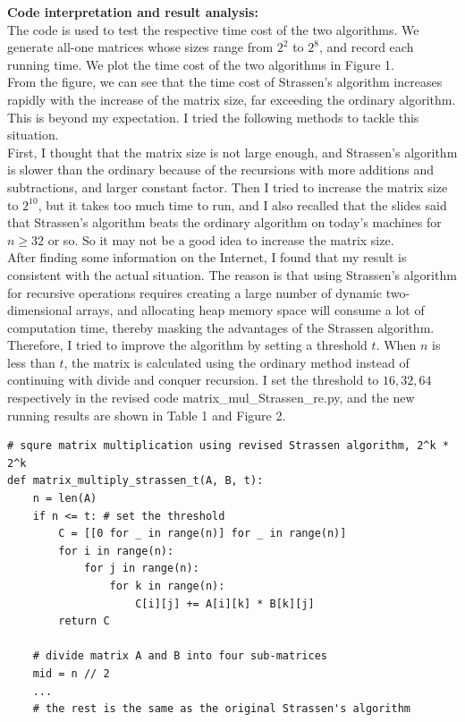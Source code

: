 \documentclass[UTF8]{ctexart}
\begin{document}
\textbf{Code interpretation and result analysis:} \\
The code is used to test the respective time cost of the two algorithms. We generate all-one matrices whose sizes range from $2^2$ to $2^{8}$, 
and record each running time. We plot the time cost of the two algorithms in Figure 1.\\
From the figure, we can see that the time cost of Strassen's algorithm increases rapidly with the increase of the matrix size, far exceeding the ordinary algorithm.
This is beyond my expectation. I tried the following methods to tackle this situation.\\
First, I thought that the matrix size is not large enough, and Strassen's algorithm is slower than the ordinary because of the recursions with more additions and subtractions, and larger constant factor.
Then I tried to increase the matrix size to $2^{10}$, but it takes too much time to run, and I also recalled that the slides said that Strassen's algorithm beats the ordinary algorithm on
today's machines for $n \geq 32$ or so. So it may not be a good idea to increase the matrix size.\\
After finding some information on the Internet, I found that my result is consistent with the actual situation. The reason is that using Strassen's algorithm for recursive operations requires creating 
a large number of dynamic two-dimensional arrays, and allocating heap memory space will consume a lot of computation time, thereby masking the advantages of the Strassen algorithm. 
Therefore, I tried to improve the algorithm by setting a threshold $t$. When $n$ is less than $t$, the matrix is calculated using the ordinary method instead of continuing with divide and conquer recursion.
I set the threshold to $16, 32, 64$ respectively in the revised code matrix\_mul\_Strassen\_re.py, and the new running results are shown in Table 1 and Figure 2.\\
\begin{lstlisting}
# squre matrix multiplication using revised Strassen algorithm, 2^k * 2^k
def matrix_multiply_strassen_t(A, B, t):
    n = len(A)  
    if n <= t: # set the threshold
        C = [[0 for _ in range(n)] for _ in range(n)]
        for i in range(n):
            for j in range(n):
                for k in range(n):
                    C[i][j] += A[i][k] * B[k][j]
        return C
    
    # divide matrix A and B into four sub-matrices
    mid = n // 2
    ...
    # the rest is the same as the original Strassen's algorithm
\end{lstlisting}
\end{document}
